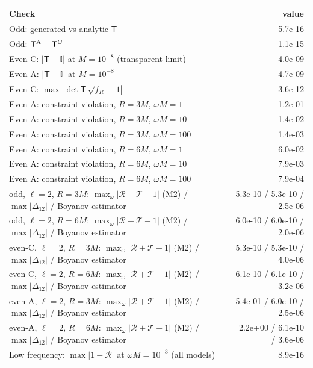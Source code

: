 \begin{tabular}{lr}\toprule
Check & value\\\midrule
Odd: generated vs analytic $\mathsf T$ & 5.7e-16 \\
Odd: $\mathsf T^{\rm A}-\mathsf T^{\rm C}$ & 1.1e-15 \\
Even C: $|\mathsf T-\mathbb{I}|$ at $M=10^{-8}$ (transparent limit) & 4.0e-09 \\
Even A: $|\mathsf T-\mathbb{I}|$ at $M=10^{-8}$ & 4.7e-09 \\
Even C: $\max|\det\mathsf T\,\sqrt{f_R}-1|$ & 3.6e-12 \\
Even A: constraint violation, $R=3M$, $\omega M=1$ & 1.2e-01 \\
Even A: constraint violation, $R=3M$, $\omega M=10$ & 1.4e-02 \\
Even A: constraint violation, $R=3M$, $\omega M=100$ & 1.4e-03 \\
Even A: constraint violation, $R=6M$, $\omega M=1$ & 6.0e-02 \\
Even A: constraint violation, $R=6M$, $\omega M=10$ & 7.9e-03 \\
Even A: constraint violation, $R=6M$, $\omega M=100$ & 7.9e-04 \\
odd, $\ell=2$, $R=3M$: $\max_\omega|\mathcal R+\mathcal T-1|$ (M2) / $\max|\Delta_{12}|$ / Boyanov estimator & 5.3e-10 / 5.3e-10 / 2.5e-06 \\
odd, $\ell=2$, $R=6M$: $\max_\omega|\mathcal R+\mathcal T-1|$ (M2) / $\max|\Delta_{12}|$ / Boyanov estimator & 6.0e-10 / 6.0e-10 / 2.0e-06 \\
even-C, $\ell=2$, $R=3M$: $\max_\omega|\mathcal R+\mathcal T-1|$ (M2) / $\max|\Delta_{12}|$ / Boyanov estimator & 5.3e-10 / 5.3e-10 / 4.0e-06 \\
even-C, $\ell=2$, $R=6M$: $\max_\omega|\mathcal R+\mathcal T-1|$ (M2) / $\max|\Delta_{12}|$ / Boyanov estimator & 6.1e-10 / 6.1e-10 / 3.2e-06 \\
even-A, $\ell=2$, $R=3M$: $\max_\omega|\mathcal R+\mathcal T-1|$ (M2) / $\max|\Delta_{12}|$ / Boyanov estimator & 5.4e-01 / 6.0e-10 / 2.5e-06 \\
even-A, $\ell=2$, $R=6M$: $\max_\omega|\mathcal R+\mathcal T-1|$ (M2) / $\max|\Delta_{12}|$ / Boyanov estimator & 2.2e+00 / 6.1e-10 / 3.6e-06 \\
Low frequency: $\max|1-\mathcal R|$ at $\omega M=10^{-3}$ (all models) & 8.9e-16 \\
\bottomrule\end{tabular}
